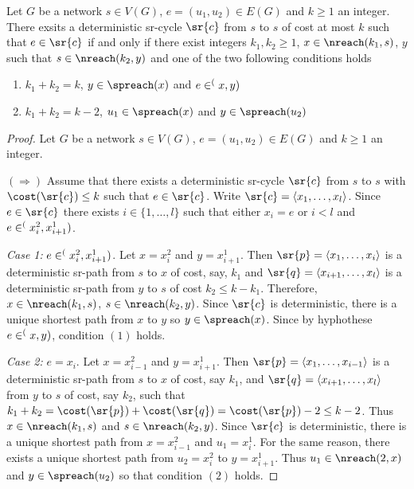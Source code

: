 \begin{theorem}
Let $G$ be a network $s \in V(G)$, $e = (u_1, u_2) \in E(G)$ and $k \geq 1$ an integer. There exsits a deterministic sr-cycle $\sr{c}$
from $s$ to $s$ of cost at most $k$ such that $e \in \sr{c}$ if and only if there exist integers $k_1, k_2 \geq 1$, $x \in \nreach(k_1, s)$, $y$ such that $s \in \nreach(k_2, y)$ 
and one of the two following conditions holds
\begin{enumerate}[(1)]
 \item $k_1 + k_2 = k$, $y \in \spreach(x)$ and $e \in \sp(x, y)$
 \item $k_1 + k_2 = k - 2$, $u_1 \in \spreach(x)$ and $y \in \spreach(u_2)$
\end{enumerate}
\end{theorem}

\begin{proof}
Let $G$ be a network $s \in V(G)$, $e = (u_1, u_2) \in E(G)$ and $k \geq 1$ an integer.

$(\Rightarrow)$ Assume that there exists a deterministic sr-cycle $\sr{c}$ from $s$ to $s$
with $\cost(\sr{c}) \leq k$ such that $e \in \sr{c}$. Write $\sr{c} = \langle x_1, \ldots, x_l \rangle$.
Since $e \in \sr{c}$ there exists $i \in \{1, \ldots, l\}$ such that either $x_i = e$ or $i < l$ and
$e \in \sp(x^2_{i}, x^1_{i + 1})$.

\emph{Case 1:} $e \in \sp(x^2_{i}, x^1_{i + 1})$. Let $x = x^2_{i}$ and $y = x^1_{i + 1}$. Then $\sr{p} = \langle x_1, \ldots, x_{i} \rangle$ is a deterministic sr-path
from $s$ to $x$ of cost, say, $k_1$ and $\sr{q} = \langle x_{i + 1}, \ldots, x_l \rangle$ is a deterministic sr-path from $y$ to $s$ of cost $k_2 \leq k - k_1$. 
Therefore, $x \in \nreach(k_1, s)$, $s \in \nreach(k_2, y)$. Since $\sr{c}$ is deterministic, there is a unique shortest path
from $x$ to $y$ so $y \in \spreach(x)$. Since by hyphothese $e \in \sp(x, y)$, condition $(1)$ holds.

\emph{Case 2:} $e = x_i$. Let $x = x^2_{i - 1}$ and $y = x^1_{i + 1}$. Then $\sr{p} = \langle x_1, \ldots, x_{i - 1} \rangle$ is a deterministic sr-path
from $s$ to $x$ of cost, say $k_1$, and $\sr{q} = \langle x_{i + 1}, \ldots, x_l \rangle$ from $y$ to $s$ of cost, say $k_2$, such that
$k_1 + k_2 = \cost(\sr{p}) + \cost(\sr{q}) = \cost(\sr{p}) - 2 \leq k - 2$. Thus $x \in \nreach(k_1, s)$ and $s \in \nreach(k_2, y)$.
Since $\sr{c}$ is deterministic, there is a unique shortest path from $x = x^2_{i - 1}$ and $u_1 = x^1_i$. For the same reason,
there exists a unique shortest path from $u_2 = x^2_i$ to $y = x^1_{i + 1}$.  Thus $u_1 \in \nreach(2, x)$ and $y \in \spreach(u_2)$ so that
condition $(2)$ holds.


\end{proof}
